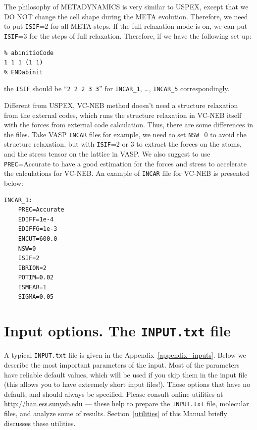\documentclass[12pt]{article}
\newcommand{\keyword}[1]{\texttt{#1}}
\newcommand{\file}[1]{\texttt{#1}}
\begin{document}
The philosophy of METADYNAMICS is very similar to USPEX, except that we DO NOT
change the cell shape during the META evolution. Therefore, we need to put
\keyword{ISIF}=2 for all META steps. If the full relaxation mode is on, we can
put \keyword{ISIF}=3 for the steps of full relaxation. Therefore, if we have the
following set up:

\begin{verbatim}
% abinitioCode 
1 1 1 (1 1) 
% ENDabinit
\end{verbatim}

the \keyword{ISIF} should be ``\texttt{2 2 2 3 3}'' for \file{INCAR\_1},
\ldots, \file{INCAR\_5} correspondingly.

Different from USPEX, VC-NEB method doesn't need a structure relaxation from the
external codes, which runs the structure relaxation in VC-NEB itself with the
forces from external code calculation. Thus, there are some differences in the
files. Take VASP \file{INCAR} files for example, we need to set \keyword{NSW}=0
to avoid the structure relaxation, but with \keyword{ISIF}=2 or 3 to extract the
forces on the atoms, and the stress tensor on the lattice in VASP. We also
suggest to use \keyword{PREC}=Accurate to have a good estimation for the forces
and stress to accelerate the calculations for VC-NEB. An example of \file{INCAR}
file for VC-NEB is presented below:

\begin{verbatim}
INCAR_1:
    PREC=Accurate
    EDIFF=1e-4
    EDIFFG=1e-3
    ENCUT=600.0
    NSW=0
    ISIF=2
    IBRION=2
    POTIM=0.02
    ISMEAR=1 
    SIGMA=0.05
\end{verbatim}


\newpage
\section{Input options. The \file{INPUT.txt} file} \label{inputs}
A typical \file{INPUT.txt} file is given in the Appendix~\ref{appendix_inputs}.
Below we describe the most important parameters of the input. Most of the
parameters have reliable default values, which will be used if you skip them in
the input file (this allows you to have extremely short input files!). Those
options that have no default, and should always be specified. Please consult
online utilities at \textcolor{blue}{\url{http://han.ess.sunysb.edu}} --- these
help to prepare the \file{INPUT.txt} file, molecular files, and analyze some of
results. Section~\ref{utilities} of this Manual briefly discusses these
utilities.
\end{document}
